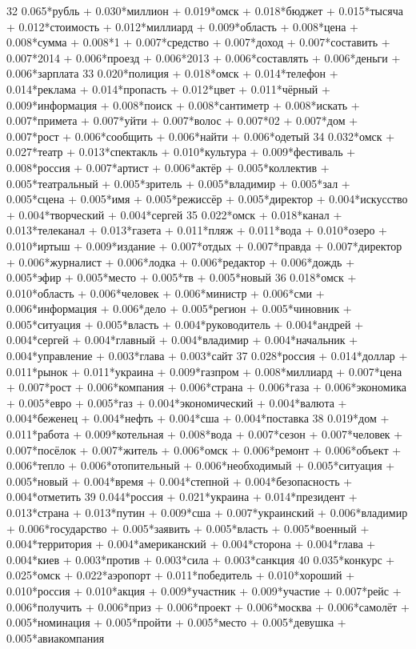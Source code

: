 32 0.065*рубль + 0.030*миллион + 0.019*омск + 0.018*бюджет + 0.015*тысяча + 0.012*стоимость + 0.012*миллиард + 0.009*область + 0.008*цена + 0.008*сумма + 0.008*1 + 0.007*средство + 0.007*доход + 0.007*составить + 0.007*2014 + 0.006*проезд + 0.006*2013 + 0.006*составлять + 0.006*деньги + 0.006*зарплата
33 0.020*полиция + 0.018*омск + 0.014*телефон + 0.014*реклама + 0.014*пропасть + 0.012*цвет + 0.011*чёрный + 0.009*информация + 0.008*поиск + 0.008*сантиметр + 0.008*искать + 0.007*примета + 0.007*уйти + 0.007*волос + 0.007*02 + 0.007*дом + 0.007*рост + 0.006*сообщить + 0.006*найти + 0.006*одетый
34 0.032*омск + 0.027*театр + 0.013*спектакль + 0.010*культура + 0.009*фестиваль + 0.008*россия + 0.007*артист + 0.006*актёр + 0.005*коллектив + 0.005*театральный + 0.005*зритель + 0.005*владимир + 0.005*зал + 0.005*сцена + 0.005*имя + 0.005*режиссёр + 0.005*директор + 0.004*искусство + 0.004*творческий + 0.004*сергей
35 0.022*омск + 0.018*канал + 0.013*телеканал + 0.013*газета + 0.011*пляж + 0.011*вода + 0.010*озеро + 0.010*иртыш + 0.009*издание + 0.007*отдых + 0.007*правда + 0.007*директор + 0.006*журналист + 0.006*лодка + 0.006*редактор + 0.006*дождь + 0.005*эфир + 0.005*место + 0.005*тв + 0.005*новый
36 0.018*омск + 0.010*область + 0.006*человек + 0.006*министр + 0.006*сми + 0.006*информация + 0.006*дело + 0.005*регион + 0.005*чиновник + 0.005*ситуация + 0.005*власть + 0.004*руководитель + 0.004*андрей + 0.004*сергей + 0.004*главный + 0.004*владимир + 0.004*начальник + 0.004*управление + 0.003*глава + 0.003*сайт
37 0.028*россия + 0.014*доллар + 0.011*рынок + 0.011*украина + 0.009*газпром + 0.008*миллиард + 0.007*цена + 0.007*рост + 0.006*компания + 0.006*страна + 0.006*газа + 0.006*экономика + 0.005*евро + 0.005*газ + 0.004*экономический + 0.004*валюта + 0.004*беженец + 0.004*нефть + 0.004*сша + 0.004*поставка
38 0.019*дом + 0.011*работа + 0.009*котельная + 0.008*вода + 0.007*сезон + 0.007*человек + 0.007*посёлок + 0.007*житель + 0.006*омск + 0.006*ремонт + 0.006*объект + 0.006*тепло + 0.006*отопительный + 0.006*необходимый + 0.005*ситуация + 0.005*новый + 0.004*время + 0.004*степной + 0.004*безопасность + 0.004*отметить
39 0.044*россия + 0.021*украина + 0.014*президент + 0.013*страна + 0.013*путин + 0.009*сша + 0.007*украинский + 0.006*владимир + 0.006*государство + 0.005*заявить + 0.005*власть + 0.005*военный + 0.004*территория + 0.004*американский + 0.004*сторона + 0.004*глава + 0.004*киев + 0.003*против + 0.003*сила + 0.003*санкция
40 0.035*конкурс + 0.025*омск + 0.022*аэропорт + 0.011*победитель + 0.010*хороший + 0.010*россия + 0.010*акция + 0.009*участник + 0.009*участие + 0.007*рейс + 0.006*получить + 0.006*приз + 0.006*проект + 0.006*москва + 0.006*самолёт + 0.005*номинация + 0.005*пройти + 0.005*место + 0.005*девушка + 0.005*авиакомпания

